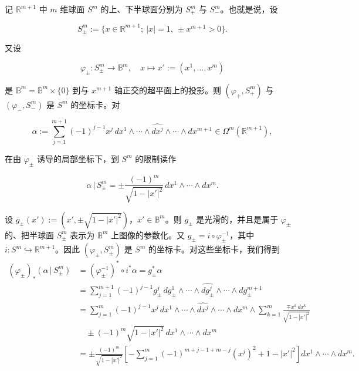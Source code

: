 \begin{example}

\begin{items}
\item

记 $ \mathbb{R}^{m+1} $ 中 $ m $ 维球面 $ S^{m} $ 的上、下半球面分别为 $ S_{+}^{m} $ 与 $ S_{-}^{m} $。也就是说，设

\[
S_{\pm}^{m} := \{x\in\mathbb{R}^{m+1} ;\ |x| = 1,\ \pm x^{m+1} > 0\}.
\]

又设

\[
\varphi_{\pm} : S_{\pm}^{m}\to\mathbb{B}^{m}, \quad x\mapsto x' := (x^{1},\ldots,x^{m})
\]

是 $ \mathbb{B}^{m} = \mathbb{B}^{m}\times\{0\} $ 到与 $ x^{m+1} $ 轴正交的超平面上的投影。则 $ (\varphi_{+},S_{+}^{m}) $ 与 $ (\varphi_{-},S_{-}^{m}) $ 是 $ S^{m} $ 的坐标卡。对

\[
\alpha := \sum_{j=1}^{m+1}(-1)^{j-1}x^{j}\,dx^{1}\wedge\cdots\wedge\widehat{dx^{j}}\wedge\cdots\wedge dx^{m+1}\in\Omega^{m}(\mathbb{R}^{m+1}),
\]

在由 $ \varphi_{\pm} $ 诱导的局部坐标下，到 $ S^{m} $ 的限制读作

\[
\alpha\,|\,S_{\pm}^{m} = \pm\frac{(-1)^{m}}{\sqrt{1-|x'|^{2}}}\,dx^{1}\wedge\cdots\wedge dx^{m}.
\]

\proofhead
设 $ g_{\pm}(x') := (x',\pm\sqrt{1-|x'|^{2}}) $，$ x'\in\mathbb{B}^{m} $。则 $ g_{\pm} $ 是光滑的，并且是属于 $ \varphi_{\pm} $ 的、把半球面 $ S_{\pm}^{m} $ 表示为 $ \mathbb{B}^{m} $ 上图像的参数化。又 $ g_{\pm} = i\circ\varphi_{\pm}^{-1} $，其中 $ i : S^{m}\hookrightarrow\mathbb{R}^{m+1} $。因此 $ (\varphi_{\pm},S_{\pm}^{m}) $ 是 $ S^{m} $ 的坐标卡。对这些坐标卡，我们得到
\begin{equation*}
\begin{aligned}
(\varphi_{\pm})_{\ast}(\alpha\,|\,S_{\pm}^{m}) &= (\varphi_{\pm}^{-1})^{\ast}\circ i^{\ast}\alpha = g_{\pm}^{\ast}\alpha\\ &= \sum_{j=1}^{m+1}(-1)^{j-1}g_{\pm}^{j}\,dg_{\pm}^{1}\wedge\cdots\wedge\widehat{dg_{\pm}^{j}}\wedge\cdots\wedge dg_{\pm}^{m+1}\\ &= \sum_{j=1}^{m}(-1)^{j-1}x^{j}\,dx^{1}\wedge\cdots\wedge\widehat{dx^{j}}\wedge\cdots\wedge dx^{m}\wedge\sum_{k=1}^{m}\frac{\mp x^{k}\,dx^{k}}{\sqrt{1-|x'|^{2}}}\\ &\quad \pm(-1)^{m}\sqrt{1-|x'|^{2}}\,dx^{1}\wedge\cdots\wedge dx^{m}\\ &= \pm\frac{(-1)^{m}}{\sqrt{1-|x'|^{2}}}\left[-\sum_{j=1}^{m}(-1)^{m+j-1+m-j}(x^{j})^{2}+1-|x'|^{2}\right]dx^{1}\wedge\cdots\wedge dx^{m}.
\end{aligned}
\end{equation*}


\end{items}
\end{example}
